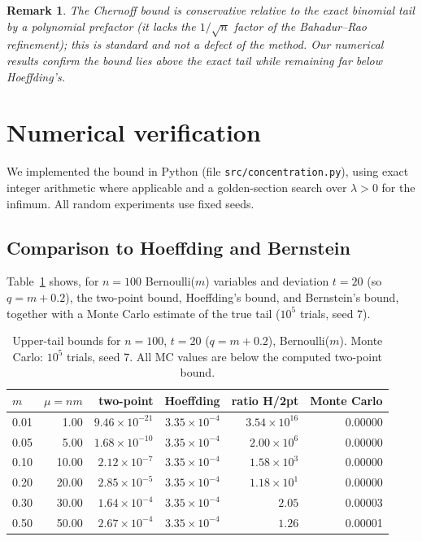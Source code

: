 \documentclass[11pt]{article}
\newtheorem{remark}[theorem]{Remark}
\begin{document}
\begin{remark}
The Chernoff bound is conservative relative to the exact binomial tail by a polynomial prefactor (it lacks the $1/\sqrt{n}$ factor of the Bahadur--Rao refinement); this is standard and not a defect of the method. Our numerical results confirm the bound lies above the exact tail while remaining far below Hoeffding's.
\end{remark}

\section{Numerical verification}
We implemented the bound in Python (file \texttt{src/concentration.py}), using exact integer arithmetic where applicable and a golden-section search over $\lambda>0$ for the infimum. All random experiments use fixed seeds.

\subsection{Comparison to Hoeffding and Bernstein}
Table~\ref{tab:compare} shows, for $n=100$ Bernoulli($m$) variables and deviation $t=20$ (so $q=m+0.2$), the two-point bound, Hoeffding's bound, and Bernstein's bound, together with a Monte Carlo estimate of the true tail ($10^5$ trials, seed 7).

\begin{table}[htbp]
\centering
\caption{Upper-tail bounds for $n=100$, $t=20$ ($q=m+0.2$), Bernoulli($m$). Monte Carlo: $10^5$ trials, seed 7. All MC values are below the computed two-point bound.}
\label{tab:compare}
\begin{tabular}{@{}lrrrrr@{}}
\toprule
$m$ & $\mu=nm$ & two-point & Hoeffding & ratio H/2pt & Monte Carlo \\
\midrule
0.01 & 1.00  & $9.46\times10^{-21}$ & $3.35\times10^{-4}$ & $3.54\times10^{16}$ & 0.00000 \\
0.05 & 5.00  & $1.68\times10^{-10}$ & $3.35\times10^{-4}$ & $2.00\times10^{6}$  & 0.00000 \\
0.10 & 10.00 & $2.12\times10^{-7}$  & $3.35\times10^{-4}$ & $1.58\times10^{3}$  & 0.00000 \\
0.20 & 20.00 & $2.85\times10^{-5}$  & $3.35\times10^{-4}$ & $1.18\times10^{1}$  & 0.00000 \\
0.30 & 30.00 & $1.64\times10^{-4}$  & $3.35\times10^{-4}$ & $2.05$              & 0.00003 \\
0.50 & 50.00 & $2.67\times10^{-4}$  & $3.35\times10^{-4}$ & $1.26$              & 0.00001 \\
\bottomrule
\end{tabular}
\end{table}
\end{document}
